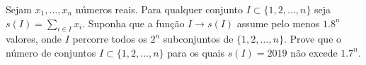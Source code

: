 Sejam \(x_1,\ldots,x_n\) números reais. Para qualquer conjunto \(I\subset\{1,2,\ldots,n\}\) seja \(s(I)=\sum_{i\in I}x_i\). Suponha que a função \(I\to s(I)\) assume pelo menos \(1.8^n\) valores, onde \(I\) percorre todos os \(2^n\) subconjuntos de \(\{1,2,\ldots,n\}\). Prove que o número de conjuntos \(I\subset \{1,2,\ldots,n\}\) para os quais \(s(I)=2019\) não excede \(1.7^n\).
